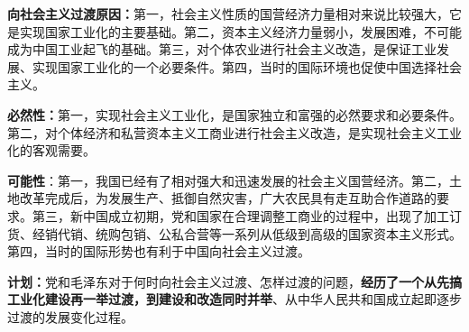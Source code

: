 \textbf{{向社会主义过渡原因}：}第一，社会主义性质的国营经济力量相对来说比较强大，它是实现国家工业化的主要基础。第二，资本主义经济力量弱小，发展困难，不可能成为中国工业起飞的基础。第三，对个体农业进行社会主义改造，是保证工业发展、实现国家工业化的一个必要条件。第四，当时的国际环境也促使中国选择社会主义。

\textbf{{必然性}：}第一，实现社会主义工业化，是国家独立和富强的必然要求和必要条件。第二，对个体经济和私营资本主义工商业进行社会主义改造，是实现社会主义工业化的客观需要。

\textbf{{可能性}}：第一，我国已经有了相对强大和迅速发展的社会主义国营经济。第二，土地改革完成后，为发展生产、抵御自然灾害，广大农民具有走互助合作道路的要求。第三，新中国成立初期，党和国家在合理调整工商业的过程中，出现了加工订货、经销代销、统购包销、公私合营等一系列从低级到高级的国家资本主义形式。第四，当时的国际形势也有利于中国向社会主义过渡。

\textbf{{计划}：}{党和毛泽东对于何时向社会主义过渡、怎样过渡的问题，}\textbf{{经历了一个从先搞工业化建设再一举过渡，到建设和改造同时并举}}{、从中华人民共和国成立起即逐步过渡的发展变化过程。}
